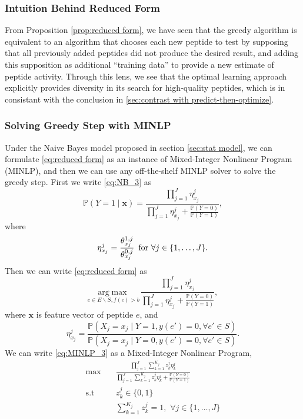 \documentclass[11pt]{article}
\newcommand{\Prob}{\mathbb{P}}
\begin{document}
\subsubsection{Intuition Behind Reduced Form}
From Proposition \ref{prop:reduced form}, we have seen that the greedy algorithm is equivalent to an algorithm that chooses each new peptide to test by supposing that all previously added peptides did not produce the desired result, and adding this supposition as additional \enquote{training data} to provide a new estimate of peptide activity. Through this lens, we see that the optimal learning approach explicitly provides diversity in its search for high-quality peptides, which is in consistant with the conclusion in \ref{sec:contrast with predict-then-optimize}.

\subsubsection{Solving Greedy Step with MINLP} \label{sec: MINLP approach}
Under the Naive Bayes model proposed in section \ref{sec:stat model}, 
we can formulate \eqref{eq:reduced form} as an instance of Mixed-Integer 
Nonlinear Program (MINLP), and then we can use any off-the-shelf MINLP 
solver to solve the greedy step. First we write \eqref{eq:NB_3} as
\begin{equation}
  \Prob (Y = 1 \mid \bm{x}) = \frac{\prod_{j=1}^J \eta^j_{x_j}}
  {\prod_{j=1}^J \eta^j_{x_j} + \frac{\Prob(Y = 0)}{\Prob(Y = 1)}},
  \label{eq:MINLP_2}
\end{equation}
where
\begin{equation*}
  \eta^j_{x_j} = \frac{\theta^{1,j}_{x_j}}{\theta^{0,j}_{x_j}}
  \text{\,\,\,for $\forall j \in \{1,\ldots,J\}$}. 
\end{equation*}
Then we can write \eqref{eq:reduced form} as
\begin{equation}
  \underset{e \in E \backslash S, f(e) > b}{\mathrm{arg}\max} \, \frac{\prod_{j = 1}^J \eta^j_{x_j}}{\prod_{j = 1}^J \eta^j_{x_j} + \frac{\Prob(Y = 0)}{\Prob(Y = 1)}},
  \label{eq:MINLP_3}
\end{equation}
where $\bm{x}$ is feature vector of peptide $e$, and
\begin{equation*}
  \eta^j_{x_j} = \frac{\Prob(X_j = x_j \mid Y = 1, y(e') = 0, \forall e' \in S)}
  {\Prob(X_j = x_j \mid Y = 0, y(e') = 0, \forall e' \in S)}.
\end{equation*}
We can write \eqref{eq:MINLP_3} as a Mixed-Integer Nonlinear Program,
\begin{equation}
  \begin{split}
    \max \quad &\frac{\prod_{j=1}^J \sum_{k=1}^{K_j} z^j_k \eta^j_k}
    {\prod_{j=1}^J \sum_{k=1}^{K_j} z^j_k \eta^j_k + \frac{\Prob(Y = 0)}{\Prob(Y = 1)}} \\
    \text{s.t} \quad &z^j_k \in \{0,1\}\\
    &\sum_{k=1}^{K_j} z^j_k = 1, \,\, \forall j \in \{1, \ldots, J\}
  \end{split}
  \label{eq:MINLP_4}
\end{equation}
\end{document}
